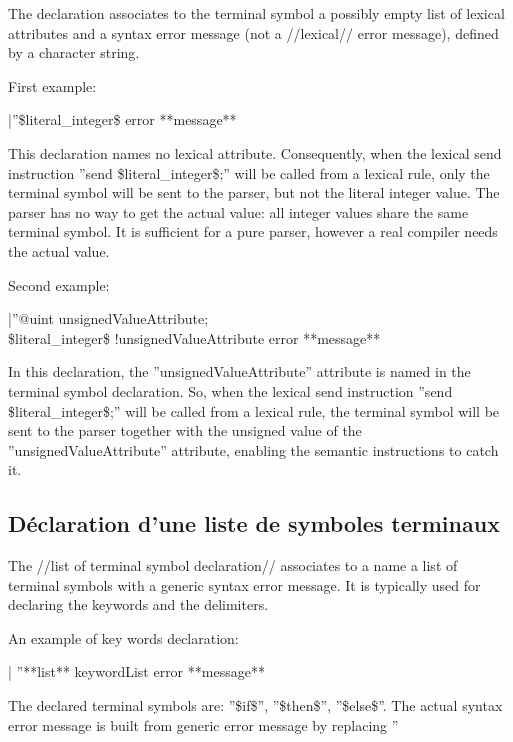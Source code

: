 {The declaration associates to the terminal symbol a possibly empty list of lexical attributes and a syntax error message (not a //lexical// error message), defined by a character string.

First example:

|''\$literal\_integer\$ error **message** %

This declaration names no lexical attribute. Consequently, when the lexical send instruction ''send \$literal\_integer\$;'' will be called from a lexical rule, only the terminal symbol will be sent to the parser, but not the literal integer value. The parser has no way to get the actual value: all integer values share the same terminal symbol. It is sufficient for a pure parser, however a real compiler needs the actual value.

Second example:

|''@uint unsignedValueAttribute;\\ 
\$literal\_integer\$ !unsignedValueAttribute error **message** %

In this declaration, the ''unsignedValueAttribute'' attribute is named in the terminal symbol declaration. So, when the lexical send instruction ''send \$literal\_integer\$;'' will be called from a lexical rule, the terminal symbol will be sent to the parser together with the unsigned value of the ''unsignedValueAttribute'' attribute, enabling the semantic instructions to catch it.

\subsection{Déclaration d'une liste de symboles terminaux}

The //list of terminal symbol declaration// associates to a name a list of terminal symbols with a generic syntax error message. It is typically used for declaring the keywords and the delimiters.

An example of key words declaration:

| ''**list** keywordList error **message** %

The declared terminal symbols are: ''\$if\$'', ''\$then\$'', ''\$else\$''. The actual syntax error message is built from generic error message by replacing ''%

}
